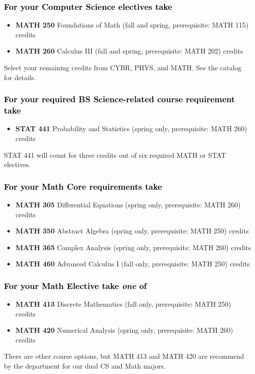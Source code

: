\documentclass[10pt]{article}
\newenvironment{mypar}[2]
   {\begin{list}{}%
     {\setlength\leftmargin{#1}
     \setlength\rightmargin{#2}}
     \item[]}
   {\end{list}}
\newcommand{\foundations}{\textbf{MATH 250} Foundations of Math (fall and spring, prerequisite: MATH 115)  \dotfill 3 credits}
\newcommand{\calcthree}{\textbf{MATH 260} Calculus III  (fall and spring, prerequisite: MATH 202) \dotfill 5 credits}
\newcommand{\discrete}{\textbf{MATH 413} Discrete Mathematics  (fall only, prerequisite: MATH 250)\dotfill 3 credits}
\newcommand{\statistics}{\textbf{STAT 441} Probability and Statistics (spring only, prerequisite: MATH 260)  \dotfill  3 credits}
\newcommand{\diffeq}{\textbf{MATH 305}	Differential Equations (spring only, prerequisite: MATH 260) \dotfill 	3 credits}
\newcommand{\abstractalgebra}{\textbf{MATH 350}	Abstract Algebra (spring only, prerequisite: MATH 250) \dotfill 	3 credits}
\newcommand{\complex}{\textbf{MATH 365}	Complex Analysis (spring only,  prerequisite: MATH 260) \dotfill 3 credits}
\newcommand{\advancedcalc}{\textbf{MATH 460}	Advanced Calculus I  (fall only,   prerequisite: MATH 250) \dotfill 3 credits}
\newcommand{\numerical}{\textbf{MATH 420}   Numerical Analysis   (spring only, prerequisite: MATH 260)\dotfill 3 credits}
\begin{document}
\subsubsection*{\textcolor{black}{For your Computer Science electives take}}

\begin{itemize}
\item \foundations
\item  \calcthree
\end{itemize}
\begin{mypar}{0.5cm}{0.5cm} Select your remaining credits from CYBR, PHYS,  and MATH. See the catalog for details.
\end{mypar}

\subsubsection*{\textcolor{black}{For your required BS Science-related course requirement take}}
\begin{itemize}
\item \statistics
\end{itemize}
\begin{mypar}{0.5cm}{0.5cm} STAT 441 will count for three credits out of six required MATH or STAT electives.
\end{mypar}

\subsubsection*{\textcolor{black}{For your Math Core requirements take}}

\begin{itemize}
  \item \diffeq
  \item \abstractalgebra
  \item \complex
  \item \advancedcalc
\end{itemize}



\subsubsection*{\textcolor{black}{For your  Math Elective take \emph{one} of}}
\begin{itemize}
\item \discrete
\item \numerical
\end{itemize}
\begin{mypar}{0.5cm}{0.5cm}  There are other course options, but  MATH 413 and MATH 420 are recommend by the department for our
dual CS and Math majors. \end{mypar}
\vfill
\begin{center} 
\end{center}
\end{document}
